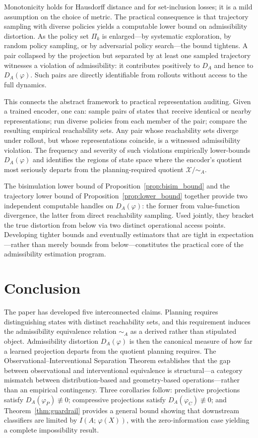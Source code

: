 \documentclass[11pt, a4paper]{article}
\theoremstyle{plain}
\theoremstyle{definition}
\theoremstyle{remark}
\newcommand{\simA}{\sim_A}
\newcommand{\DA}{D_A(\varphi)}
\begin{document}
Monotonicity holds for Hausdorff distance and for set-inclusion losses; it is a mild assumption on the choice of metric. The practical consequence is that trajectory sampling with diverse policies yields a computable lower bound on admissibility distortion. As the policy set $\Pi_k$ is enlarged---by systematic exploration, by random policy sampling, or by adversarial policy search---the bound tightens. A pair collapsed by the projection but separated by at least one sampled trajectory witnesses a violation of admissibility: it contributes positively to $\hat{D}_A$ and hence to $\DA$. Such pairs are directly identifiable from rollouts without access to the full dynamics.

This connects the abstract framework to practical representation auditing. Given a trained encoder, one can: sample pairs of states that receive identical or nearby representations; run diverse policies from each member of the pair; compare the resulting empirical reachability sets. Any pair whose reachability sets diverge under rollout, but whose representations coincide, is a witnessed admissibility violation. The frequency and severity of such violations empirically lower-bounds $\DA$ and identifies the regions of state space where the encoder's quotient most seriously departs from the planning-required quotient $\mathcal{X}/{\simA}$.

The bisimulation lower bound of Proposition~\ref{prop:bisim_bound} and the trajectory lower bound of Proposition~\ref{prop:lower_bound} together provide two independent computable handles on $\DA$: the former from value-function divergence, the latter from direct reachability sampling. Used jointly, they bracket the true distortion from below via two distinct operational access points. Developing tighter bounds and eventually estimators that are tight in expectation---rather than merely bounds from below---constitutes the practical core of the admissibility estimation program.

\section{Conclusion}

The paper has developed five interconnected claims. Planning requires
distinguishing states with distinct reachability sets, and this requirement
induces the admissibility equivalence relation $\simA$ as a derived rather than
stipulated object. Admissibility distortion $\DA$ is then the canonical measure
of how far a learned projection departs from the quotient planning requires.
The Observational--Interventional Separation Theorem establishes that the gap
between observational and interventional equivalence is structural---a category
mismatch between distribution-based and geometry-based operations---rather than
an empirical contingency. Three corollaries follow: predictive projections satisfy
$D_A(\varphi_P) \not\equiv 0$; compressive projections satisfy
$D_A(\varphi_C) \not\equiv 0$; and Theorem~\ref{thm:guardrail} provides a
general bound showing that downstream classifiers are limited by
$I(A;\,\varphi(X))$, with the zero-information case yielding a complete
impossibility result.
\end{document}
